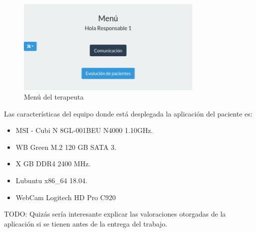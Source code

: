 \begin{figure}
	\centering
	\includegraphics[width=0.8\textwidth]{img/menu_responsable.png}
	\caption{Menú del terapeuta}
	\label{fig:menu_respon}
\end{figure}

Las características del equipo donde está desplegada la aplicación del paciente es:
\begin{itemize}
	\item MSI - Cubi N 8GL-001BEU N4000 1.10GHz.
	\item WB Green M.2 120 GB SATA 3.
	\item X GB DDR4 2400 MHz.
	\item Lubuntu x86\_64 18.04.
	\item WebCam Logitech HD Pro C920
\end{itemize}

TODO: Quizás sería interesante explicar las valoraciones otorgadas de la aplicación si se tienen antes de la entrega del trabajo. 
